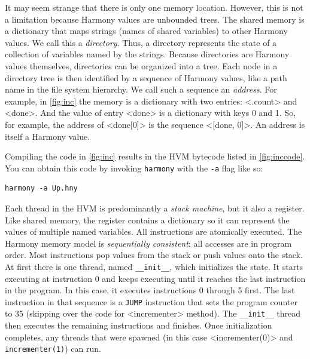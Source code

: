 \documentclass{report}
\newenvironment{code}{
\tcolorbox
}{
\endtcolorbox
}
\begin{document}
It may seem strange that there is only one memory location.
However, this is not a limitation because Harmony values are unbounded trees.
The shared memory is a dictionary that maps strings (names of shared
variables) to other Harmony values.
We call this a \emph{directory}.
%
Thus, a directory represents the state of a collection of variables named
by the strings.
%
Because directories are Harmony values themselves,
directories can be organized into a tree.
Each node in a directory tree is then identified
by a sequence of Harmony values, like a path name in the file system
hierarchy.  We call such a sequence an \emph{address}.
%
For example, in \autoref{fig:inc} the memory is a dictionary with two
entries: <{.count}> and <{done}>.  And the value of entry
<{done}> is a dictionary with keys 0 and 1.
So, for example, the address of <{done[0]}> is the sequence <{[done, 0]}>.
An address is itself a Harmony value.

%

Compiling the code in \autoref{fig:inc} results in the HVM bytecode
listed in \autoref{fig:inccode}.
You can obtain this code by invoking \texttt{harmony} with the \texttt{-a} flag
like so:
\begin{code}
\begin{verbatim}
harmony -a Up.hny
\end{verbatim}
\end{code}
Each thread in the HVM is predominantly a \emph{stack machine},
%
but it also a register.
Like shared memory, the register contains a dictionary so it
can represent the values of multiple named variables.
%
%
All instructions are atomically executed.
The Harmony memory model is \emph{sequentially consistent}: all
accesses are in program order.
Most instructions pop values from the stack or push values onto the stack.
At first there is one thread, named \texttt{\_\_init\_\_},
which initializes the state.
It starts executing at instruction 0 and keeps executing until
it reaches the last instruction in the program.
In this case, it executes instructions 0 through 5 first.
The last instruction in that sequence is a \texttt{JUMP}
instruction that sets the program counter to 35
(skipping over the code for <{incrementer}> method).
The \texttt{\_\_init\_\_} thread then executes the
remaining instructions and finishes.
Once initialization completes, any threads that were spawned
(in this case <{incrementer(0)}> and \texttt{incrementer(1)})
can run.
\end{document}
